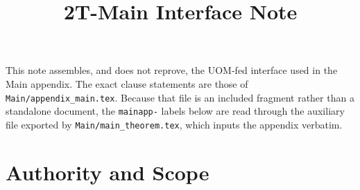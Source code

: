 \documentclass[11pt]{article}
\title{2T-Main Interface Note}
\author{}
\date{}
\theoremstyle{definition}
\theoremstyle{plain}
\theoremstyle{remark}
\begin{document}
\maketitle

This note assembles, and does not reprove, the UOM-fed interface used in the Main appendix.
The exact clause statements are those of \texttt{Main/appendix\_main.tex}.
Because that file is an included fragment rather than a standalone document, the
\texttt{mainapp-} labels below are read through the auxiliary file exported by
\texttt{Main/main\_theorem.tex}, which inputs the appendix verbatim.

\section{Authority and Scope}
\end{document}
